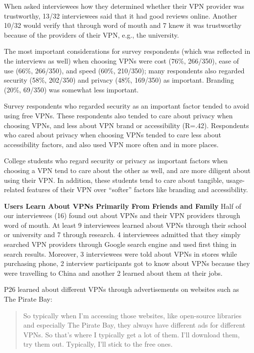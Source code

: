 When asked interviewees how they determined whether
their VPN provider was trustworthy, 13/32 interviewees said that it had
good reviews online. Another 10/32 would verify that through word of mouth and 7
knew it was trustworthy because of the providers of their VPN, e.g., the
university. 

The most important considerations for survey respondents (which was reflected in the interviews as well) when choosing VPNs
were cost (76\%, 266/350), ease of use (66\%, 266/350), and speed (60\%,
210/350); many respondents also regarded security (58\%, 202/350) and privacy
(48\%, 169/350) as important. Branding (20\%, 69/350) was somewhat less
important.

Survey respondents who regarded security as an important factor tended to avoid using
free VPNs. These respondents also tended to care about privacy when choosing
VPNs, and less about VPN brand or accessibility (R=.42). Respondents who cared
about privacy when choosing VPNs tended to care less about accessibility
factors, and also used VPN more often and in more places.

College students who regard security or privacy as important factors when
choosing a VPN tend to care about the other as well, and are more diligent
about using their VPN. In addition, these students tend to care about
tangible, usage-related features of their VPN over “softer” factors like
branding and accessibility.



\textbf{Users Learn About VPNs Primarily From Friends and Family} Half of our interviewees (16) found out about
VPNs and their VPN providers through word of mouth. At
least 9 interviewees learned about VPNs through their school or university and
7 through research. 4 interviewees admitted that they simply searched VPN
providers through Google search engine and used first thing in
search results. Moreover, 3 interviewees were told about VPNs in stores while
purchasing phone, 2 interview participants got to know about VPNs because they
were travelling to China and another 2 learned about them at their jobs.


P26 learned about different VPNs through advertisements on websites such as
The Pirate Bay: \begin{quote}So typically when I'm accessing those websites,
    like open-source libraries and especially The Pirate Bay, they always have
    different ads for different VPNs. So that's where I typically get a lot of
    them. I'll download them, try them out. Typically, I'll stick to the free
    ones.\end{quote}

